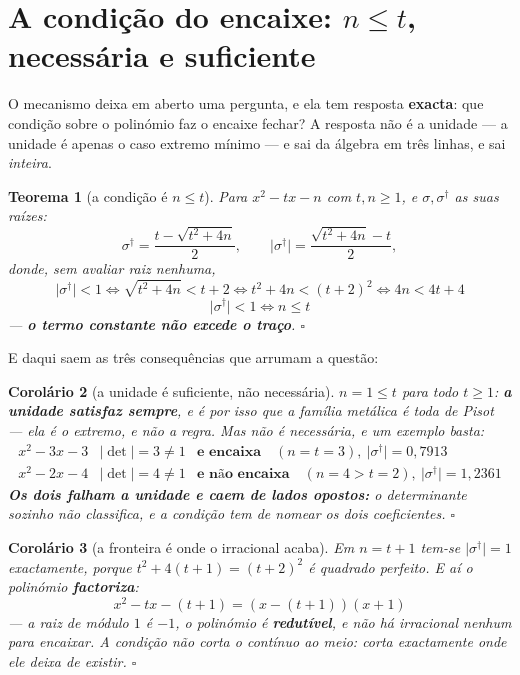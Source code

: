 \documentclass[11pt,a4paper]{article}
\newtheorem{teorema}{Teorema}
\newtheorem{corolario}[teorema]{Corolário}
\newcommand{\abs}[1]{\lvert #1\rvert}
\newcommand{\dg}{^{\dagger}}
\begin{document}
\section{A condição do encaixe: $n\leq t$, necessária e suficiente}\label{sec:contra}

O mecanismo deixa em aberto uma pergunta, e ela tem resposta \textbf{exacta}: que
condição sobre o polinómio faz o encaixe fechar? A resposta não é a unidade --- a
unidade é apenas o caso extremo mínimo --- e sai da álgebra em três linhas, e sai
\emph{inteira}.

\begin{teorema}[a condição é $n\leq t$]\label{thm:condicao}
Para $x^{2}-tx-n$ com $t,n\geq1$, e $\sigma,\sigma\dg$ as suas raízes:
\[
\sigma\dg=\frac{t-\sqrt{t^{2}+4n}}{2},\qquad
\abs{\sigma\dg}=\frac{\sqrt{t^{2}+4n}-t}{2},
\]
donde, sem avaliar raiz nenhuma,
\[
\abs{\sigma\dg}<1
\iff \sqrt{t^{2}+4n}<t+2
\iff t^{2}+4n<(t+2)^{2}
\iff 4n<4t+4
\]
\[
\boxed{\;\abs{\sigma\dg}<1\iff n\leq t\;}
\]
--- \textbf{o termo constante não excede o traço}. $\square$
\end{teorema}

\noindent E daqui saem as três consequências que arrumam a questão:

\begin{corolario}[a unidade é suficiente, não necessária]\label{cor:unidade}
$n=1\leq t$ para todo $t\geq1$: \textbf{a unidade satisfaz sempre}, e é por isso
que a família metálica é toda de Pisot --- ela é o \emph{extremo}, e não a regra.
Mas não é necessária, e um exemplo basta:
\[
\boxed{
\begin{array}{lll}
x^{2}-3x-3 & \abs{\det}=3\neq1 & \textbf{e encaixa}\quad(n=t=3),\ \abs{\sigma\dg}=0{,}7913\\[3pt]
x^{2}-2x-4 & \abs{\det}=4\neq1 & \textbf{e não encaixa}\quad(n=4>t=2),\ \abs{\sigma\dg}=1{,}2361
\end{array}}
\]
\textbf{Os dois falham a unidade e caem de lados opostos:} o determinante sozinho
não classifica, e a condição tem de nomear os \emph{dois} coeficientes. $\square$
\end{corolario}

\begin{corolario}[a fronteira é onde o irracional acaba]\label{cor:fronteira}
Em $n=t+1$ tem-se $\abs{\sigma\dg}=1$ \emph{exactamente}, porque
$t^{2}+4(t+1)=(t+2)^{2}$ é quadrado perfeito. E aí o polinómio \textbf{factoriza}:
\[
\boxed{\;x^{2}-tx-(t+1)=(x-(t+1))(x+1)\;}
\]
--- a raiz de módulo $1$ é $-1$, o polinómio é \textbf{redutível}, e não há
irracional nenhum para encaixar. \emph{A condição não corta o contínuo ao meio:
corta exactamente onde ele deixa de existir.} $\square$
\end{corolario}
\end{document}
